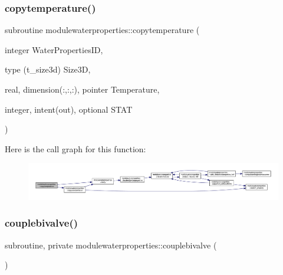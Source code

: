 \subsubsection{\texorpdfstring{copytemperature()}{copytemperature()}}
{\footnotesize\ttfamily subroutine modulewaterproperties\+::copytemperature (\begin{DoxyParamCaption}\item[{integer}]{Water\+Properties\+ID,  }\item[{type (t\+\_\+size3d)}]{Size3D,  }\item[{real, dimension(\+:,\+:,\+:), pointer}]{Temperature,  }\item[{integer, intent(out), optional}]{S\+T\+AT }\end{DoxyParamCaption})\hspace{0.3cm}{\ttfamily [private]}}

Here is the call graph for this function\+:\nopagebreak
\begin{figure}[H]
\begin{center}
\leavevmode
\includegraphics[width=350pt]{namespacemodulewaterproperties_a6c8ccf3bc2c3f4cc47ee4ebfd2a2b354_cgraph}
\end{center}
\end{figure}
\mbox{\label{namespacemodulewaterproperties_ab7e6de4d55639d85393ee68b800ba784}} 
\subsubsection{\texorpdfstring{couplebivalve()}{couplebivalve()}}
{\footnotesize\ttfamily subroutine, private modulewaterproperties\+::couplebivalve (\begin{DoxyParamCaption}{ }\end{DoxyParamCaption})\hspace{0.3cm}{\ttfamily [private]}}

